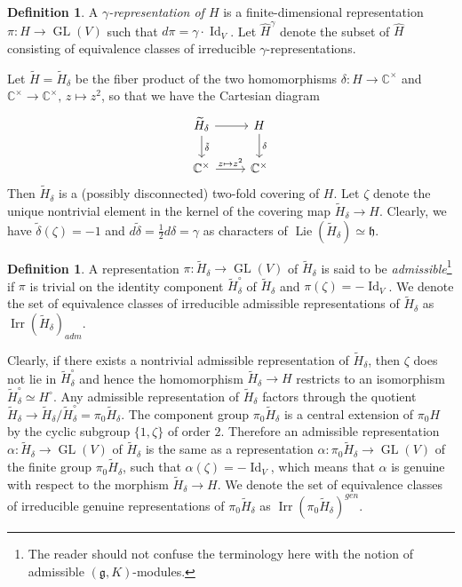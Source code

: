 \documentclass[11pt, a4paper]{amsart}
\newcommand{\C}{\mathbb{C}}
\newcommand{\g}{\mathfrak{g}}
\newcommand{\fh}{\mathfrak{h}}
\DeclareMathOperator{\Lie}{Lie}
\newcommand{\Id}{\operatorname{Id}}
\newcommand{\cm}{\C^\times}
\newcommand{\GL}{\operatorname{GL}}
\newcommand{\Irr}{\operatorname{Irr}}
\theoremstyle{definition}
\newtheorem{defi}[Thm]{Definition}
\numberwithin{equation}{section}
\begin{document}
\begin{defi}\label{defn:gamma_repn}
	A \emph{$\gamma$-representation of $H$} is a finite-dimensional representation $\pi: H \to \GL(V)$ such that $d \pi = \gamma \cdot \Id_V$. Let $\widehat{H}^\gamma$ denote the subset of $\widehat{H}$ consisting of equivalence classes of irreducible $\gamma$-representations.
\end{defi}

Let $\widetilde{H} = \widetilde{H}_\delta$ be the fiber product of the two homomorphisms $\delta: H \to \cm$ and $\cm \to \cm, \, z \mapsto z^2$, so that we have the Cartesian diagram
\begin{equation}\label{diag:H_tilde}
	\begin{tikzcd}
		\widetilde{H}_\delta \arrow{r} \arrow[d, "\tilde{\delta}"]  & H  \arrow[d, "\delta"]   \\
		\cm \arrow[r, "z \mapsto z^2"]  & \cm
	\end{tikzcd}
\end{equation}
Then $\widetilde{H}_\delta$ is a (possibly disconnected) two-fold covering of $H$. Let $\zeta$ denote the unique nontrivial element in the kernel of the covering map $\widetilde{H}_\delta \to H$. Clearly, we have $\tilde{\delta}(\zeta) = -1$ and $d \tilde{\delta} = \frac{1}{2} d \delta = \gamma$ as characters of $\Lie(\widetilde{H}_\delta) \simeq \fh$.

\begin{defi}\label{defn:adm}
	A representation $\pi: \widetilde{H}_\delta \to \GL(V)$ of $\widetilde{H}_\delta$ is said to be \emph{admissible}\footnote{The reader should not confuse the terminology here with the notion of admissible $(\g, K)$-modules.}
	if $\pi$ is trivial on the identity component $\widetilde{H}_\delta^\circ$ of $\widetilde{H}_\delta$ and $\pi(\zeta) = -\Id_V$. We denote the set of equivalence classes of irreducible admissible representations of $\widetilde{H}_\delta$ as $\Irr(\widetilde{H}_\delta)_{adm}$.
\end{defi}

Clearly, if there exists a nontrivial admissible representation of $\widetilde{H}_\delta$, then $\zeta$ does not lie in $\widetilde{H}_\delta^\circ$ and hence the homomorphism $\widetilde{H}_\delta \to H$ restricts to an isomorphism $\widetilde{H}_\delta^\circ \simeq H^\circ$. 
Any admissible representation of $\widetilde{H}_\delta$ factors through the quotient $\widetilde{H}_\delta \to \widetilde{H}_\delta/\widetilde{H}_\delta^\circ = \pi_0 \widetilde{H}_\delta$. The component group $\pi_0 \widetilde{H}_\delta$ is a central extension of $\pi_0 H$ by the cyclic subgroup $\{1, \zeta\}$ of order $2$. Therefore an admissible representation $\alpha: \widetilde{H}_\delta \to \GL(V)$ of $\widetilde{H}_\delta$ is the same as a representation $\alpha: \pi_0 \widetilde{H}_\delta \to \GL(V)$ of the finite group $\pi_0 \widetilde{H}_\delta$, such that $\alpha(\zeta) = -\Id_V$, which means that $\alpha$ is genuine with respect to the morphism $\widetilde{H}_\delta \to H$. We denote the set of equivalence classes of irreducible genuine representations of $\pi_0 \widetilde{H}_\delta$ as $\Irr(\pi_0 \widetilde{H}_\delta)^{gen}$.
\end{document}
